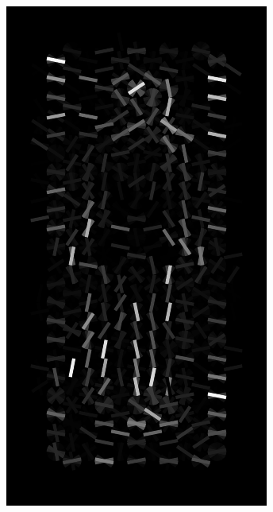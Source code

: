 \documentclass[thesis.tex]{subfiles}
\begin{document}
\begin{figure}
\begin{subfigure}[t]{0.135\textwidth}
		\includegraphics[width=\textwidth]{img/inriaExampleDescriptorSvm.pdf}
		\caption{}
		\vspace{2mm}
	\end{subfigure}
	\begin{subfigure}[t]{0.135\textwidth}

\end{subfigure}
\end{figure}
\end{document}
